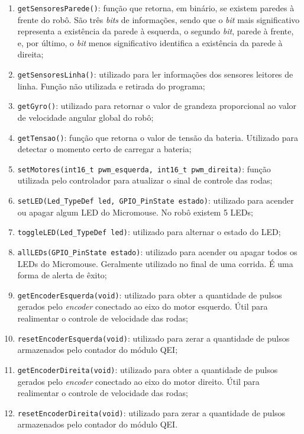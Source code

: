 \begin{enumerate}[leftmargin=2cm,label=\alph*)]
	\item \verb+getSensoresParede()+: função que retorna, em binário, se existem paredes à frente do robô. São três \emph{bits} de informações, sendo que o \emph{bit} mais significativo representa a existência da parede à esquerda, o segundo \emph{bit}, parede à frente, e, por último, o \emph{bit} menos significativo identifica a existência da parede à direita;
	\item \verb+getSensoresLinha()+: utilizado para ler informações dos sensores leitores de linha. Função não utilizada e retirada do programa;
	\item \verb+getGyro()+: utilizado para retornar o valor de grandeza proporcional ao valor de velocidade angular global do robô;
	\item \verb+getTensao()+: função que retorna o valor de tensão da bateria. Utilizado para detectar o momento certo de carregar a bateria;
	\item \verb+setMotores(int16_t pwm_esquerda, int16_t pwm_direita)+: função utilizada pelo controlador para atualizar o sinal de controle das rodas;
	\item \verb+setLED(Led_TypeDef led, GPIO_PinState estado)+: utilizado para acender ou apagar algum LED do Micromouse. No robô existem 5 LEDs;
	\item \verb+toggleLED(Led_TypeDef led)+: utilizado para alternar o estado do LED;
	\item \verb+allLEDs(GPIO_PinState estado)+: utilizado para acender ou apagar todos os {LEDs} do Micromouse. Geralmente utilizado no final de uma corrida. É uma forma de alerta de êxito;
	\item \verb+getEncoderEsquerda(void)+: utilizado para obter a quantidade de pulsos gerados pelo \emph{encoder} conectado ao eixo do motor esquerdo. Útil para realimentar o controle de velocidade das rodas;
	\item \verb+resetEncoderEsquerda(void)+: utilizado para zerar a quantidade de pulsos armazenados pelo contador do módulo QEI;
	\item \verb+getEncoderDireita(void)+: utilizado para obter a quantidade de pulsos gerados pelo \emph{encoder} conectado ao eixo do motor direito. Útil para realimentar o controle de velocidade das rodas;
	\item \verb+resetEncoderDireita(void)+: utilizado para zerar a quantidade de pulsos armazenados pelo contador do módulo QEI.
\end{enumerate}

